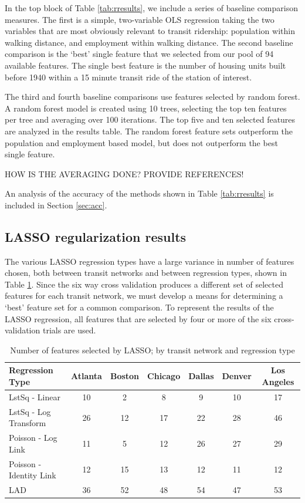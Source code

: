 \documentclass[11pt]{article}
\begin{document}
In the top block of Table \ref{tab:rresults}, we include a series of baseline comparison measures. The first is a simple, two-variable OLS regression taking the two variables that are most obviously relevant to transit ridership: population within walking distance, and employment within walking distance. The second baseline comparison is the `best' single feature that we selected from our pool of 94 available features. The single best feature is the number of housing units built before 1940 within a 15 minute transit ride of the station of interest. 

The third and fourth baseline comparisons use features selected by random forest. A random forest model is created using 10 trees, selecting the top ten features per tree and averaging over 100 iterations. The top five and ten selected features are analyzed in the results table. The random forest feature sets outperform the population and employment based model, but does not outperform the best single feature. 

HOW IS THE AVERAGING DONE? PROVIDE REFERENCES!

An analysis of the accuracy of the methods shown in Table \ref{tab:rresults} is included in Section \ref{sec:acc}.

\subsection{LASSO regularization results}

The various LASSO regression types have a large variance in number of features chosen, both between transit networks and between regression types, shown in Table \ref{tab:lassoFeatNum}. Since the six way cross validation produces a different set of selected features for each transit network, we must develop a means for determining a `best' feature set for a common comparison. To represent the results of the LASSO regression, all features that are selected by four or more of the six cross-validation trials are used. 

\begin{table}[H]
\begingroup\fontsize{10}{15}\selectfont
\centering
\begin{tabular}{l|cccccc}
Regression Type&Atlanta&Boston&Chicago&Dallas&Denver&Los Angeles\\
\midrule
LstSq - Linear&10&2&8&9&10&17\\
LstSq - Log Transform&26&12&17&22&28&46\\
Poisson - Log Link&11&5&12&26&27&29\\
Poisson - Identity Link&12&15&13&12&11&12\\
LAD&36&52&48&54&47&53\\
\end{tabular}
\caption{Number of features selected by LASSO; by transit network and regression type}\label{tab:lassoFeatNum}
\endgroup
\end{table}
\end{document}
